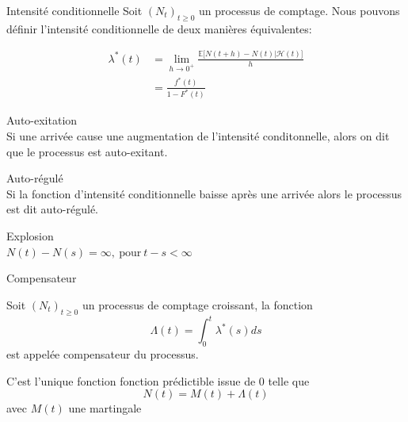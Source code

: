 \documentclass{beamer}
\newcommand{\blue}[1]{\textcolor{navblue}{#1}}
\begin{document}
\begin{frame}{Intensité conditionnelle}
  Soit $(N_t)_{t \geq 0}$ un processus de comptage. Nous pouvons définir l'intensité conditionnelle de deux manières équivalentes:
\begin{definition}
\begin{equation*}
\begin{aligned}
\lambda^*(t) &= \lim_{h \to 0^{+}} \frac{\mathbb{E}\bigl[N(t+h)-N(t) | \mathcal{H}(t)\bigr]}{h}\\
&= \frac{f^*(t)}{1 - F^*(t)}
\end{aligned}
\end{equation*}
\end{definition}

\pause


\blue{Auto-exitation} \\

Si une arrivée cause une augmentation de l'intensité conditonnelle, alors on dit que le processus est auto-exitant.

\pause

\blue{Auto-régulé}\\
Si la fonction d'intensité conditionnelle baisse après une arrivée alors le processus est dit auto-régulé.

\pause

\blue{Explosion}  \\

$N(t) - N(s) = \infty, ~\text{pour}~ t - s  < \infty$


\end{frame}

\begin{frame}{Compensateur}
  \begin{definition}[Compensateur]
    Soit $(N_t)_{t \geq 0}$  un processus de comptage croissant, la fonction
    \begin{equation*}
      \Lambda(t) = \int_{0}^{t}\lambda^*(s) ds
    \end{equation*}
    est appelée compensateur du processus.
  \end{definition}

  \pause
  C'est l'unique fonction fonction prédictible issue de 0 telle que
  \begin{equation*}
    N(t) = M(t) + \Lambda(t)
  \end{equation*}
  avec $M(t)$ une martingale

\end{frame}
\end{document}
